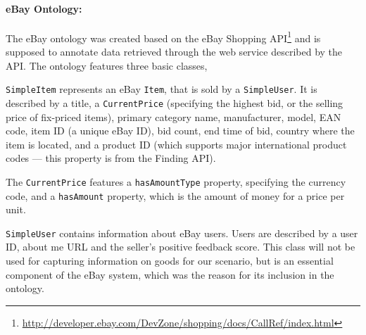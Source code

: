 \paragraph{eBay Ontology:}
The eBay ontology was created based on the eBay Shopping API\footnote{\url{http://developer.ebay.com/DevZone/shopping/docs/CallRef/index.html}} and is supposed to annotate data retrieved through the web service described by the API.
% 
% 
The ontology features three basic classes,
\begin{inparaenum}[(1)]
    \item \texttt{SimpleItem} represents an eBay \texttt{Item}, that is sold by a \texttt{SimpleUser}. It is described by a title, a \texttt{CurrentPrice} (specifying the highest bid, or the selling price of fix-priced items), primary category name, manufacturer, model, EAN code, item ID (a unique eBay ID), bid count, end time of bid, country where the item is located, and a product ID (which supports major international product codes --- this property is from the Finding API).
    \item The \texttt{CurrentPrice} features a \texttt{hasAmountType} property, specifying the currency code, and a \texttt{hasAmount} property, which is the amount of money for a price per unit.
    \item \texttt{SimpleUser} contains information about eBay users. Users are described by a user ID, about me URL and the seller's positive feedback score. This class will not be used for capturing information on goods for our scenario, but is an essential component of the eBay system, which was the reason for its inclusion in the ontology.
\end{inparaenum}

